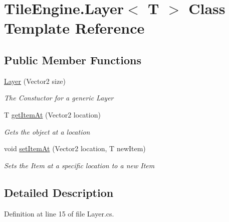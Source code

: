\hypertarget{class_tile_engine_1_1_layer_3_01_t_01_4}{\section{Tile\-Engine.\-Layer$<$ T $>$ Class Template Reference}
\label{class_tile_engine_1_1_layer_3_01_t_01_4}
}
\subsection*{Public Member Functions}
\begin{DoxyCompactItemize}
\item 
\hyperlink{class_tile_engine_1_1_layer_3_01_t_01_4_ab2027713dabf92056a4679b2b011deb4}{Layer} (Vector2 size)
\begin{DoxyCompactList}\small\item\em The Constuctor for a generic Layer \end{DoxyCompactList}\item 
T \hyperlink{class_tile_engine_1_1_layer_3_01_t_01_4_ab7bb577b8cba3afa6615d5ce7e517bcb}{get\-Item\-At} (Vector2 location)
\begin{DoxyCompactList}\small\item\em Gets the object at a location \end{DoxyCompactList}\item 
void \hyperlink{class_tile_engine_1_1_layer_3_01_t_01_4_ae348117cda11530eb1bc3448a772ea03}{set\-Item\-At} (Vector2 location, T new\-Item)
\begin{DoxyCompactList}\small\item\em Sets the Item at a specific location to a new Item \end{DoxyCompactList}\end{DoxyCompactItemize}


\subsection{Detailed Description}


Definition at line 15 of file Layer.\-cs.



